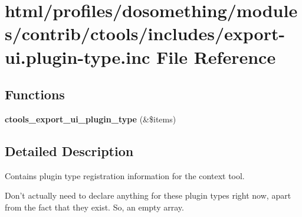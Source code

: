 \hypertarget{export-ui_8plugin-type_8inc}{
\section{html/profiles/dosomething/modules/contrib/ctools/includes/export-\/ui.plugin-\/type.inc File Reference}
\label{export-ui_8plugin-type_8inc}
}
\subsection*{Functions}
\begin{DoxyCompactItemize}
\item 
\hypertarget{export-ui_8plugin-type_8inc_ad15dc7186cb513e85132736804448e68}{
{\bfseries ctools\_\-export\_\-ui\_\-plugin\_\-type} (\&\$items)}
\label{export-ui_8plugin-type_8inc_ad15dc7186cb513e85132736804448e68}

\end{DoxyCompactItemize}


\subsection{Detailed Description}
Contains plugin type registration information for the context tool.

Don't actually need to declare anything for these plugin types right now, apart from the fact that they exist. So, an empty array. 